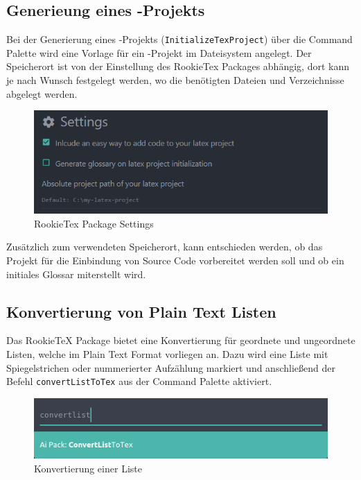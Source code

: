         \subsection{Generieung eines \latex-Projekts}
            Bei der Generierung eines \latex-Projekts (\texttt{InitializeTexProject}) über die Command Palette wird eine Vorlage für ein \latex-Projekt im Dateisystem angelegt. Der Speicherort ist von der Einstellung des RookieTex Packages abhängig, dort kann je nach Wunsch festgelegt werden, wo die benötigten Dateien und Verzeichnisse abgelegt werden.
            \begin{figure}[H]
                \centering
                \includegraphics[scale=0.5]{img/package_settings.png}
                \caption{RookieTex Package Settings}
            \end{figure}
            Zusätzlich zum verwendeten Speicherort, kann entschieden werden, ob das Projekt für die Einbindung von Source Code vorbereitet werden soll und ob ein initiales Glossar miterstellt wird.

        \subsection{Konvertierung von Plain Text Listen}
            Das RookieTeX Package bietet eine Konvertierung für geordnete und ungeordnete Listen, welche im Plain Text Format vorliegen an. Dazu wird eine Liste mit Spiegelstrichen oder nummerierter Aufzählung markiert und anschließend der Befehl \texttt{convertListToTex} aus der Command Palette aktiviert.
            \\[5mm]
            \begin{figure}[H]
                \centering
                \includegraphics[scale=0.5]{img/convert_list_cp.png}
                \caption{Konvertierung einer Liste}
            \end{figure}

